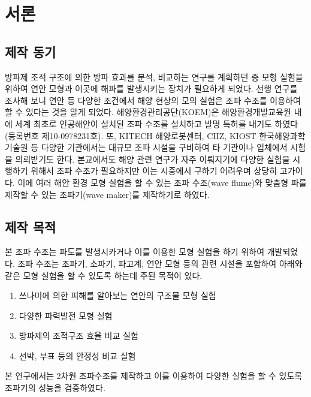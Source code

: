 \section{서론}


\subsection{제작 동기}

방파제 조적 구조에 의한 방파 효과를 분석, 비교하는 연구를 계획하던 중 모형 실험을 위하여 연안 모형과 이곳에 해파를 발생시키는 장치가 필요하게 되었다. 선행 연구를 조사해 보니 연안 등 다양한 조건에서 해양 현상의 모의 실험은 조파 수조를 이용하여 할 수 있다는 것을 알게 되었다\cite{chung2013}. 해양환경관리공단(KOEM)은 해양환경개발교육원 내에 세계 최초로 인공해안이 설치된 조파 수조를 설치하고 발명 특허를 내기도 하였다 (등록번호 제10-0978231호). 또, KITECH 해양로봇센터, CIIZ, KIOST 한국해양과학기술원 등 다양한 기관에서는 대규모 조파 시설을 구비하여 타 기관이나 업체에서 시험을 의뢰받기도 한다. 본교에서도 해양 관련 연구가 자주 이뤄지기에 다양한 실험을 시행하기 위해서 조파 수조가 필요하지만 이는 시중에서 구하기 어려우며 상당히 고가이다. 이에 여러 해안 환경 모형 실험을 할 수 있는 조파 수조(wave flume)와 맞춤형 파를 제작할 수 있는 조파기(wave maker)를 제작하기로 하였다. 


\subsection{제작 목적}

본 조파 수조는 파도를 발생시카거나 이를 이용한 모형 실험을 하기 위하여 개발되었다. 조파 수조는 조파기, 소파기, 파고계, 연안 모형 등의 관련 시설을 포함하여 아래와 같은 모형 실험을 할 수 있도록 하는데 주된 목적이 있다.

\begin{enumerate}
    \item 쓰나미에 의한 피해를 알아보는 연안의 구조물 모형 실험
    \item 다양한 파력발전 모형 실험
    \item 방파제의 조적구조 효율 비교 실험
    \item 선박, 부표 등의 안정성 비교 실험
\end{enumerate}

본 연구에서는 2차원 조파수조를 제작하고 이를 이용하여 다양한 실험을 할 수 있도록 조파기의 성능을 검증하였다. 
